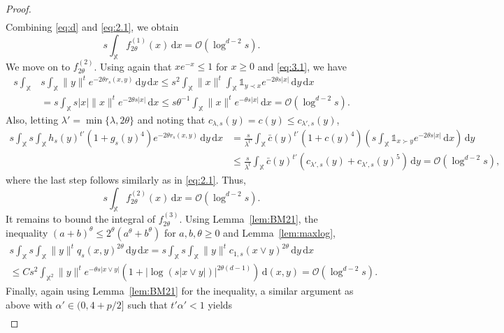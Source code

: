 \documentclass[11pt,reqno]{amsart}
\numberwithin{equation}{section}
\theoremstyle{definition}
\newcommand{\XX}{\mathbb{X}}
\newcommand{\diff}{{\,\mathrm d}}
\begin{document}
\begin{proof}
\begin{align}
	\end{align}
	Combining \eqref{eq:d} and \eqref{eq:2.1}, we obtain
	\begin{displaymath}
	s \int_{\XX} f_{2\theta}^{(1)}(x) \diff x =\mathcal{O}(\log^{d-2} s).
	\end{displaymath}
	We move on to $f_{2\theta}^{(2)}$. Using again that $xe^{-x} \le 1$
	for $x \geq0$ and \eqref{eq:3.1}, we have
	\begin{align*}
	s\int_{\XX} &s\int_{\XX} \|y\|^t e^{-2\theta r_s(x,y)}\diff y
	\diff x \le  s^2 \int_{\XX} \|x\|^t \int_\XX
	\mathds{1}_{y \prec x} e^{- 2\theta s |x|}
	\diff y \diff x\\
	&= s \int_{\XX} s|x|  \|x\|^t e^{- 2\theta s |x|}\diff x
	\le  s\theta^{-1} \int_{\XX} \|x\|^t e^{- \theta s |x|}\diff x=\mathcal{O}(\log^{d-2} s). 
	\end{align*}
	Also, letting $\lambda'=\min\{\lambda,2\theta\}$ and noting that $c_{\lambda,s}(y)=c (y) \le c_{\lambda',s}(y)$,
	\begin{align*}
	s \int_{\XX} s \int_{\XX} h_s(y)^{t'} (1+g_{s}(y)^4) e^{- 2\theta r_s(x,y)} 
	\diff y \diff x
	&= \frac{s}{\lambda^{t'}} \int_{\XX} \bar c (y)^{t'} (1+c(y)^4) \left(s\int_\XX \mathds{1}_{x \succ y}
	e^{-2\theta s |x|} \diff x \right)\diff y\\
	&\le  \frac{s}{\lambda^t} \int_{\XX} \bar c (y)^{t'} (c_{\lambda',s}(y) + c_{\lambda',s}(y)^5)\diff y =\mathcal{O}(\log^{d-2} s),
	\end{align*}
	where the last step follows similarly as in \eqref{eq:2.1}. Thus,
	\begin{displaymath}
	s \int_{\XX} f_{2\theta}^{(2)}(x) \diff x=\mathcal{O}(\log^{d-2} s).
	\end{displaymath}
	It remains to  bound the integral of $f_{2\theta}^{(3)}$. Using Lemma~\ref{lem:BM21}, the inequality $(a+b)^\theta \le 2^\theta (a^\theta + b^\theta)$ for $a, b,\theta \ge 0$ and Lemma~\ref{lem:maxlog},
	\begin{multline*}
	s \int_{\XX} s \int_{\XX} \|y\|^t q_s(x,y)^{2\theta}
	\diff y \diff x = s \int_{\XX} s \int_{\XX} \|y\|^t c_{1,s}(x \vee y)^{2\theta} 
	\diff y \diff x\\
	\le C s^2 \int_{\XX^2} \|y\|^t e^{-\theta s |x \vee y|} \left(1+ |\log (s|x \vee y|)|^{2\theta(d-1)}\right)
	\diff (x,y)=\mathcal{O}(\log^{d-2} s).
	\end{multline*}
	Finally, again using Lemma~\ref{lem:BM21} for the inequality, a similar argument as above with $\alpha'\in (0,4+p/2]$ such that $t'\alpha' <1$ yields
	\begin{align}\label{eq:7}

\end{align}
\end{proof}
\end{document}
